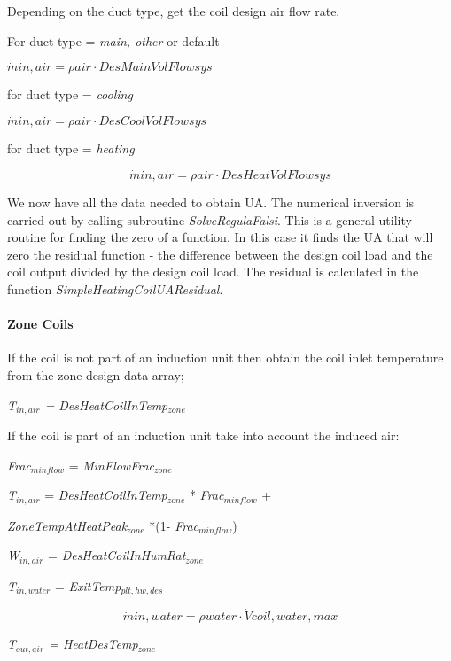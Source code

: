Depending on the duct type, get the coil design air flow rate.

For duct type = \emph{main, other} or default

\emph{\(\dot min,air = \rho air\cdot DesMainVolFlowsys\)}

for duct type = \emph{cooling}

\emph{\(\dot min,air = \rho air\cdot DesCoolVolFlowsys\)}

for duct type = \emph{heating}

\begin{equation}
\dot min,air = \rho air\cdot DesHeatVolFlowsys
\end{equation}

We now have all the data needed to obtain UA. The numerical inversion is carried out by calling subroutine \emph{SolveRegulaFalsi}. This is a general utility routine for finding the zero of a function. In this case it finds the UA that will zero the residual function - the difference between the design coil load and the coil output divided by the design coil load. The residual is calculated in the function \emph{SimpleHeatingCoilUAResidual}.

\paragraph{Zone Coils}\label{zone-coils-1}

If the coil is not part of an induction unit then obtain the coil inlet temperature from the zone design data array;

\emph{T\(_{in,air}\) = DesHeatCoilInTemp\(_{zone}\)}

If the coil is part of an induction unit take into account the induced air:

\emph{Frac\(_{minflow}\)} = \emph{MinFlowFrac\(_{zone}\)}

\emph{T\(_{in,air}\)} = \emph{DesHeatCoilInTemp\(_{zone}\)} * \emph{Frac\(_{minflow}\)} +

\emph{ZoneTempAtHeatPeak\(_{zone}\)} *(1- \emph{Frac\(_{minflow}\)})

\emph{W\(_{in,air}\)} = \emph{DesHeatCoilInHumRat\(_{zone}\)}

\emph{T\(_{in,water}\)} = \emph{ExitTemp\(_{plt,hw,des}\)}

\begin{equation}
\dot min,water = \rho water\cdot \dot Vcoil,water,max
\end{equation}

\emph{T\(_{out,air}\) = HeatDesTemp\(_{zone}\)}

